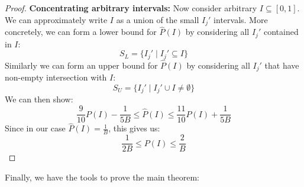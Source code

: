 \begin{proof}
\textbf{Concentrating arbitrary intervals:} Now consider arbitrary $I \subseteq [0, 1]$. We can approximately write $I$ as a union of the small $I_j'$ intervals. More concretely, we can form a lower bound for $\hat{P}(I)$ by considering all $I_j'$ contained in $I$:
\[ S_L = \{I_j' \mid I_j' \subseteq I \} \]
Similarly we can form an upper bound for $\hat{P}(I)$ by considering all $I_j'$ that have non-empty intersection with $I$:
\[ S_U = \{I_j' \mid I_j' \cup I \neq \emptyset \} \]
We can then show:
\[  \frac{9}{10} P(I) - \frac{1}{5B} \leq \hat{P}(I) \leq \frac{11}{10} P(I) + \frac{1}{5B} \]
Since in our case $\hat{P}(I) = \frac{1}{B}$, this gives us:
\[ \frac{1}{2B} \leq P(I) \leq \frac{2}{B} \]
\end{proof}

Finally, we have the tools to prove the main theorem:

